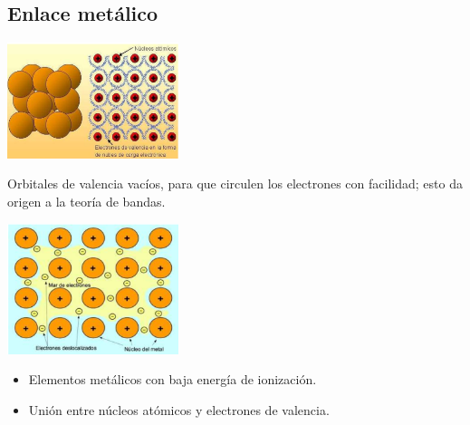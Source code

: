     \subsection{Enlace metálico}
        \begin{center} \includegraphics[width=5cm]{./imagenes/enlaceMetalico1.png} \end{center}
        \sangria{} Orbitales de valencia vacíos, para que circulen los electrones con facilidad; esto da origen a la teoría de bandas. 
        \begin{center} \includegraphics[width=5cm]{./imagenes/enlaceMetalico2.png} \end{center}
        \begin{itemize} 
            \item Elementos metálicos con baja energía de ionización.
            \item Unión entre núcleos atómicos y electrones de valencia.
        \end{itemize}
